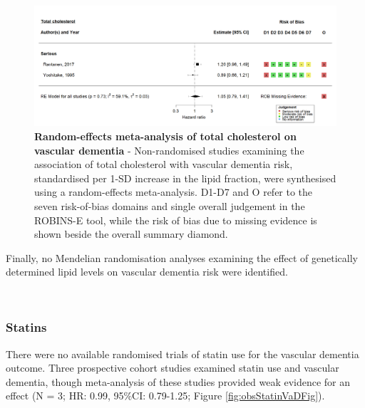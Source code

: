 \documentclass[a4paper, twoside]{templates/ociamthesis}
\begin{document}
\begin{figure}[H]
\includegraphics[width=1\linewidth]{figures/sys-rev/fp_obs_VaD_TC_} \caption[Random-effects meta-analysis of total cholesterol on vascular dementia]{\textbf{Random-effects meta-analysis of total cholesterol on vascular dementia} - Non-randomised studies examining the association of total cholesterol with vascular dementia risk, standardised per 1-SD increase in the lipid fraction, were synthesised using a random-effects meta-analysis. D1-D7 and O refer to the seven risk-of-bias domains and single overall judgement in the ROBINS-E tool, while the risk of bias due to missing evidence is shown beside the overall summary diamond.}\label{fig:lipidFractionsVaD}
\end{figure}

Finally, no Mendelian randomisation analyses examining the effect of genetically determined lipid levels on vascular dementia risk were identified.

~

\hypertarget{statins-2}{%
\subsubsection{Statins}\label{statins-2}}

There were no available randomised trials of statin use for the vascular dementia outcome. Three prospective cohort studies examined statin use and vascular dementia, though meta-analysis of these studies provided weak evidence for an effect (N = 3; HR: 0.99, 95\%CI: 0.79-1.25; Figure \ref{fig:obsStatinVaDFig}).
\end{document}
